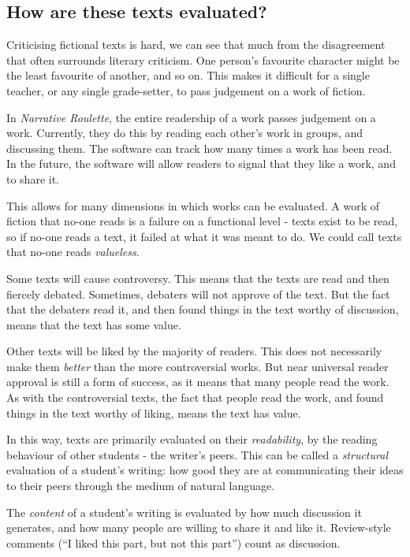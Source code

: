 \subsection{How are these texts evaluated?}

Criticising fictional texts is hard, we can see that much from the
disagreement that often surrounds literary criticism. One person's
favourite character might be the least favourite of another, and so on.
This makes it difficult for a single teacher, or any single
grade-setter, to pass judgement on a work of fiction.

In \emph{Narrative Roulette}, the entire readership of a work passes
judgement on a work. Currently, they do this by reading each other's
work in groups, and discussing them. The software can track how many
times a work has been read. In the future, the software will allow
readers to signal that they like a work, and to share it.

This allows for many dimensions in which works can be evaluated. A work of
fiction that no-one reads is a failure on a functional level - texts
exist to be read, so if no-one reads a text, it failed at what it was
meant to do. We could call texts that no-one reads \emph{valueless}.

Some texts will cause controversy. This means that the texts are read
and then fiercely debated. Sometimes, debaters will not approve of the
text. But the fact that the debaters read it, and then found things in
the text worthy of discussion, means that the text has some value.

Other texts will be liked by the majority of readers. This does not
necessarily make them \emph{better} than the more controversial works.
But near universal reader approval is still a form of success, as it means
that many people read the work. As with the controversial texts, the fact
that people read the work, and found things in the text worthy of
liking, means the text has value.

In this way, texts are primarily evaluated on their \emph{readability},
by the reading behaviour of other students - the writer's peers. This
can be called a \emph{structural} evaluation of a student's writing: how
good they are at communicating their ideas to their peers through the medium of
natural language.

The \emph{content} of a student's writing is evaluated by how much
discussion it generates, and how many people are willing to share it and like it.
Review-style comments (``I liked this part, but not this part'') count
as discussion.

